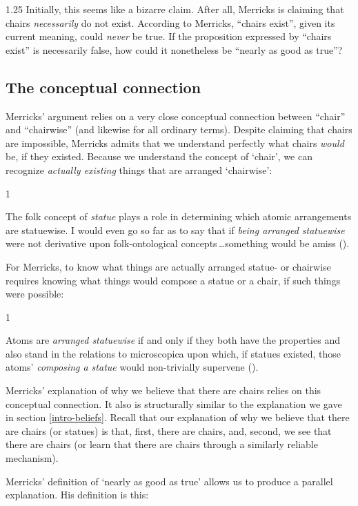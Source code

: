 \documentclass[11pt]{article}
\newenvironment{squote}{%
\begin{spacing}{1}
       	\begin{list}{}{%
\setlength{\labelwidth}{0pt}%
\rightmargin\leftmargin%
}
\item\relax
}{%
\end{list}%
\end{spacing}
}
\begin{document}
\begin{spacing}{1.25}
Initially, this seems like a bizarre claim.  After all, Merricks is
claiming that chairs {\em necessarily} do not exist.  According to
Merricks, ``chairs exist'', given its current meaning, could {\em
  never} be true.  If the proposition expressed by ``chairs exist'' is
necessarily false, how could it nonetheless be ``nearly as good as
true''?

\subsection{The conceptual connection}
\label{connection}
Merricks' argument relies on a very close conceptual connection
between ``chair'' and ``chairwise'' (and likewise for all ordinary
terms).  Despite claiming that chairs are impossible, Merricks admits
that we understand perfectly what chairs {\em would} be, if they
existed.  Because we understand the concept of `chair', we can
recognize {\em actually existing} things that are arranged
`chairwise':

\begin{squote}
The folk concept of \emph{statue} plays a role in determining which
atomic arrangements are statuewise. I would even go so far as to say
that if \emph{being arranged statuewise} were not derivative upon
folk-ontological concepts\,\ldots something would be amiss
(\citeyear[8]{merricks2001a}).
\end{squote}

For Merricks, to know what things are actually arranged statue- or
chairwise requires knowing what things would compose a statue or a
chair, if such things were possible:

\begin{squote}
Atoms are \emph{arranged statuewise} if and only if they both have the
properties and also stand in the relations to microscopica upon which,
if statues existed, those atoms' \emph{composing a statue} would
non-trivially supervene (\citeyear[4]{merricks2001a}).
\end{squote}

Merricks' explanation of why we believe that there are chairs relies
on this conceptual connection.  It also is structurally similar to the
explanation we gave in section \ref{intro-beliefs}.  Recall that our
explanation of why we believe that there are chairs (or statues) is
that, first, there are chairs, and, second, we see that there are
chairs (or learn that there are chairs through a similarly reliable
mechanism).

Merricks' definition of `nearly as good as true' allows us to produce
a parallel explanation.  His definition is this:


\end{spacing}
\end{document}

